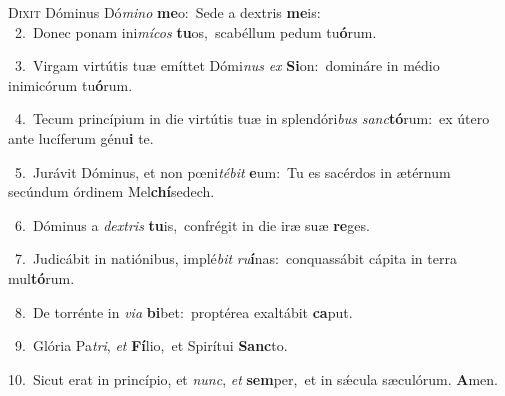 \lettrine{\initial\textcolor{\initialcolor}{D}}{ixit} Dóminus Dó\-\textit{mi}\-\textit{no} \textbf{me}\-o:~\star Sede a dextris \textbf{me}\-is:\\
{\numbfont\textcolor{\numbcolor}{~2.}}~Donec ponam ini\-\textit{mí}\-\textit{cos} \textbf{tu}\-os,~\star scabéllum pedum tu\-\textbf{ó}\-rum.\par
{\numbfont\textcolor{\numbcolor}{~3.}}~Virgam virtútis tuæ emíttet Dómi\textit{nus} \textit{ex} \textbf{Si}\-on:~\star domináre in médio inimicórum tu\-\textbf{ó}\-rum.\par
{\numbfont\textcolor{\numbcolor}{~4.}}~Tecum princípium in die virtútis tuæ in splendóri\textit{bus} \textit{sanc}\-\textbf{tó}rum:~\star ex útero ante lucíferum génu\textbf{i} te.\par
{\numbfont\textcolor{\numbcolor}{~5.}}~Jurávit Dóminus, et non pœni\-\textit{té}\-\textit{bit} \textbf{e}\-um:~\star Tu es sacérdos in ætérnum secúndum órdinem Mel\-\textbf{chí}\-sedech.\par
{\numbfont\textcolor{\numbcolor}{~6.}}~Dóminus a \textit{dex}\-\textit{tris} \textbf{tu}\-is,~\star confrégit in die iræ suæ \textbf{re}\-ges.\par
{\numbfont\textcolor{\numbcolor}{~7.}}~Judicábit in natiónibus, implé\textit{bit} \textit{ru}\-\textbf{í}nas:~\star conquassábit cápita in terra mul\-\textbf{tó}\-rum.\par
{\numbfont\textcolor{\numbcolor}{~8.}}~De torrénte in \textit{vi}\-\textit{a} \textbf{bi}\-bet:~\star proptérea exaltábit \textbf{ca}\-put.\par
{\numbfont\textcolor{\numbcolor}{~9.}}~Glória Pa\-\textit{tri}\-, \textit{et} \textbf{Fí}\-lio,~\star et Spirítui \textbf{Sanc}\-to.\par
{\numbfont\textcolor{\numbcolor}{10.}}~Sicut erat in princípio, et \textit{nunc}\-, \textit{et} \textbf{sem}\-per,~\star et in sǽcula sæculórum. \textbf{A}\-men.\par
